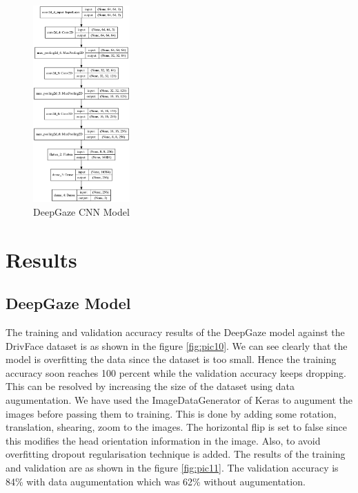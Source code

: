 \documentclass[a4paper, 12pt, oneside, BCOR1cm,toc=chapterentrywithdots]{scrbook}
\begin{document}
\begin{figure}[h]
\centering
\includegraphics[width=0.33\textwidth]{model_plot_DeepGaze.png}
\caption{DeepGaze CNN Model}
\label{fig:pic8}
\end{figure}


\section{Results}

\subsection{DeepGaze Model}

The training and validation accuracy results of the DeepGaze model against the DrivFace dataset is as shown in the figure \ref{fig:pic10}. We can see clearly that the model is overfitting the data since the dataset is too small. Hence the training accuracy soon reaches 100 percent while the validation accuracy keeps dropping. This can be resolved by increasing the size of the dataset using data augumentation. We have used the ImageDataGenerator of Keras \cite{} to augument the images before passing them to training. This is done by adding some rotation, translation, shearing, zoom to the images. The horizontal flip is set to false since this modifies the head orientation information in the image. Also, to avoid overfitting dropout regularisation \cite{} technique is added. The results of the training and validation are as shown in the figure \ref{fig:pic11}. The validation accuracy is 84\% with data augumentation which was 62\% without augumentation.
\end{document}
